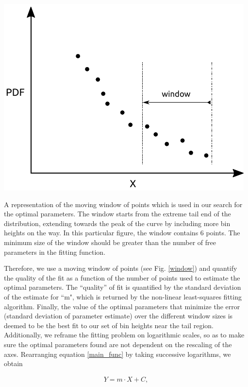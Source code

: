 \begin{marginfigure}[-1cm]
\centering
\includegraphics{plots/drop_stats/window.pdf}
\caption{A representation of the moving window of points which
	is used in our search for the optimal parameters.
	The window starts from the extreme tail end of the 
	distribution, extending towards the peak of the curve
	by including more bin heights on the way. In this 
	particular figure, the window contains $6$ points.
	The minimum size of the window should be greater than
	the number of free parameters in the fitting function.}
\label{window}
\end{marginfigure}


Therefore, we use a moving window of points (see Fig. \ref{window}) and quantify 
the quality of the fit as a function of the number of points used to estimate the optimal parameters.
The ``quality'' of fit is quantified by the standard deviation of the
estimate for ``m", which is returned by the non-linear least-squares fitting algorithm.  
Finally, the value of the optimal parameters that minimize the error 
(standard deviation of parameter estimate) over the different window sizes 
is deemed to be the best fit to our set of bin heights near the tail region.
Additionally, we reframe the fitting problem on logarithmic scales, so 
as to make sure the optimal parameters found are not dependent on the rescaling of the axes. 
Rearranging equation \eqref{main_func} by taking successive logarithms, we obtain 

\begin{align}
Y = m \cdot X + C ,
\label{log_func}
\end{align}

